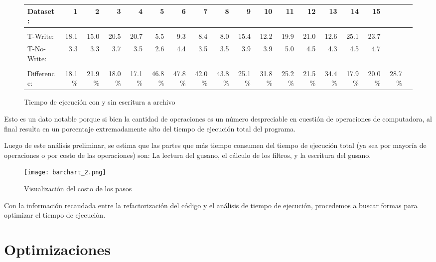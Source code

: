 \documentclass{article}
\begin{document}
\begin{enumerate}[topsep=0pt]
\begin{figure*}[h]\centering
\scriptsize
\begin{adjustbox}{width=1.2\textwidth, center}
\begin{tabular}{|l|rrrrrrrrrrrrrrr|r|r|}\toprule
Dataset: &1 &2 &3 &4 &5 &6 &7 &8 &9 &10 &11 &12 &13 &14 &15 & \\
\hline \\
T-Write: &18.1 &15.0 &20.5 &20.7 &5.5 &9.3 &8.4 &8.0 &15.4 &12.2 &19.9 &21.0 &12.6 &25.1 &23.7 & \\
T-No-Write: &3.3 &3.3 &3.7 &3.5 &2.6 &4.4 &3.5 &3.5 &3.9 &3.9 &5.0 &4.5 &4.3 &4.5 &4.7 & \\
\hline \\
Difference: &18.1\% &21.9\% &18.0\% &17.1\% &46.8\% &47.8\% &42.0\% &43.8\% &25.1\% &31.8\% &25.2\% &21.5\% &34.4\% &17.9\% &20.0\% &28.7\% \\
\bottomrule
\end{tabular}
\end{adjustbox}
\caption{Tiempo de ejecución con y sin escritura a archivo}
\label{label_w_vs_no_w}
\end{figure*}

\hspace{0.2cm} Esto es un dato notable porque si bien la cantidad de operaciones es un número despreciable en cuestión de operaciones de computadora, al final resulta en un porcentaje extremadamente alto del tiempo de ejecución total del programa.
\end{enumerate}

Luego de este análisis preliminar, se estima que las partes que más tiempo consumen del tiempo de ejecución total (ya sea por mayoría de operaciones o por costo de las operaciones) son: La lectura del gusano, el cálculo de los filtros, y la escritura del gusano.

\begin{figure*}[h]
    \centering
    \texttt{[image: barchart\_2.png]}
    \caption{Visualización del costo de los pasos}
    \label{label_barchart_1}
\end{figure*}

Con la información recaudada entre la refactorización del código y el análisis de tiempo de ejecución, procedemos a buscar formas para optimizar el tiempo de ejecución.

\section{Optimizaciones}
\end{document}
